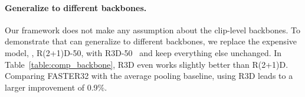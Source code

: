 \documentclass[10pt,twocolumn,letterpaper]{article}
\begin{document}
{{\paragraph{Generalize to different backbones.}
Our \oursfr framework does not make any assumption about the clip-level backbones. To demonstrate that \oursfr can generalize to different backbones, we replace the expensive model, \ie, R(2+1)D-50, with R3D-50~\cite{tran2018closer} and keep everything else unchanged. In Table~\ref{table:comp_backbone}, R3D even works slightly better than R(2+1)D. Comparing FASTER32 with the average pooling baseline,  using R3D leads to a larger improvement of  0.9\%.


\begin{table}[t]
\begin{center}
\end{center}
\end{table}}}
\end{document}
